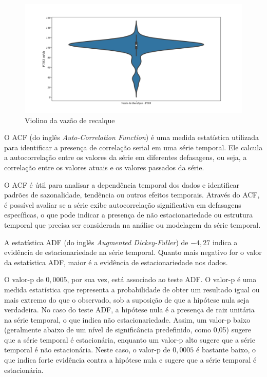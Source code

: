 	
	\begin{figure}[H]
		\centering
		\caption{Violino da vazão de recalque}
		\label{fig:ft03}
		\includegraphics[width=0.9\linewidth]{Resultados/Figuras/ft03}
		

	\end{figure}


O ACF (do inglês \textit{Auto-Correlation Function}) é uma medida estatística utilizada para identificar a presença de correlação serial em uma série temporal. Ele calcula a autocorrelação entre os valores da série em diferentes defasagens, ou seja, a correlação entre os valores atuais e os valores passados da série. 

O ACF é útil para analisar a dependência temporal dos dados e identificar padrões de sazonalidade, tendência ou outros efeitos temporais. Através do ACF, é possível avaliar se a série exibe autocorrelação significativa em defasagens específicas, o que pode indicar a presença de não estacionariedade ou estrutura temporal que precisa ser considerada na análise ou modelagem da série temporal.

A estatística ADF (do inglês \textit{Augmented Dickey-Fuller}) de $-4,27$ indica a evidência de estacionariedade na série temporal. Quanto mais negativo for o valor da estatística ADF, maior é a evidência de estacionariedade nos dados.

O valor-p de $0,0005$, por sua vez, está associado ao teste ADF. O valor-p é uma medida estatística que representa a probabilidade de obter um resultado igual ou mais extremo do que o observado, sob a suposição de que a hipótese nula seja verdadeira. No caso do teste ADF, a hipótese nula é a presença de raiz unitária na série temporal, o que indica não estacionariedade. Assim, um valor-p baixo (geralmente abaixo de um nível de significância predefinido, como 0,05) sugere que a série temporal é estacionária, enquanto um valor-p alto sugere que a série temporal é não estacionária. Neste caso, o valor-p de $0,0005$ é bastante baixo, o que indica forte evidência contra a hipótese nula e sugere que a série temporal é estacionária.

